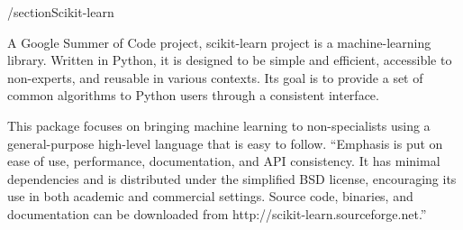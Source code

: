 /section{Scikit-learn}

A Google Summer of Code project, scikit-learn project is a machine-learning library.  Written in Python, it is designed to be simple and efficient, accessible to non-experts, and reusable in various contexts. Its goal is to provide a set of common algorithms to Python users through a consistent interface.

This package focuses on bringing machine learning to non-specialists using a general-purpose high-level language that is easy to follow. “Emphasis is put on ease of use, performance, documentation, and API consistency. It has minimal dependencies and is distributed under the simplified BSD license, encouraging its use in both academic and commercial settings. Source code, binaries, and documentation can be downloaded from http://scikit-learn.sourceforge.net.” \cite{hid-sp18-506-Scikit-learn} 

